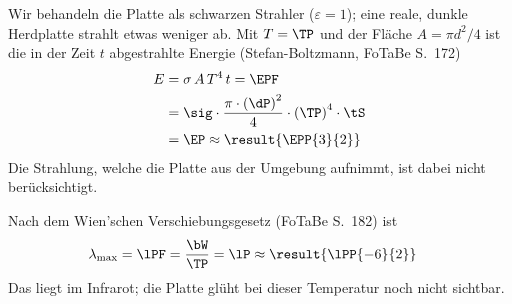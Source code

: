 \begin{abcliste}
\abc Wir behandeln die Platte als schwarzen Strahler ($\varepsilon = 1$); eine reale, dunkle Herdplatte strahlt etwas weniger ab. Mit $T = \TP$ und der Fläche $A = \pi d^2/4$ ist die in der Zeit $t$ abgestrahlte Energie (Stefan-Boltzmann, FoTaBe S.~172)
\begin{align}
 E &= \sigma\,A\,T^4\,t = \EPF \\
   &= \sig\cdot\frac{\pi\cdot\left(\dP\right)^2}{4}\cdot\left(\TP\right)^4\cdot\tS \\
   &= \EP \approx \result{\EPP{3}{2}}
\end{align}
Die Strahlung, welche die Platte aus der Umgebung aufnimmt, ist dabei nicht berücksichtigt.

\abc Nach dem Wien'schen Verschiebungsgesetz (FoTaBe S.~182) ist
\begin{align}
 \lambda_\text{max} &= \lPF = \frac{\bW}{\TP} = \lP \approx \result{\lPP{-6}{2}}
\end{align}
Das liegt im Infrarot; die Platte glüht bei dieser Temperatur noch nicht sichtbar.
\end{abcliste}
